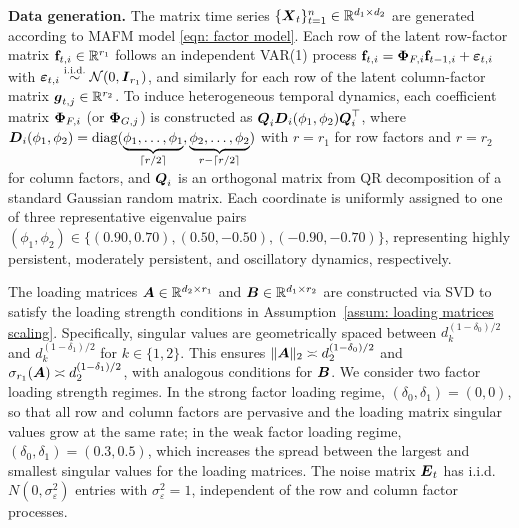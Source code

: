 \documentclass[11pt,letterpaper]{article}
\newcommand{\bfm}[1]{\ensuremath{\boldsymbol{#1}}} %
\def\bg{\bfm g}   \def\bG{\bfm G}  \def\GG{\mathbb{G}}
\theoremstyle{definition}
\newcommand{\bfv}{\mathbf{f}}
\begin{document}
\noindent
\textbf{Data generation.} The matrix time series $\{\bX_t\}_{t=1}^n \in \RR^{d_1 \times d_2}$ are generated according to MAFM model \eqref{eqn: factor model}. Each row of the latent row-factor matrix $\bfv_{t,i} \in \RR^{r_1}$ follows an independent VAR(1) process $\bfv_{t,i} = \bPhi_{F,i} \bfv_{t-1,i} + \boldsymbol{\varepsilon}_{t,i}$ with $\boldsymbol{\varepsilon}_{t,i} \stackrel{\text{i.i.d.}}{\sim} \cN(0, \bI_{r_1})$, and similarly for each row of the latent column-factor matrix $\bg_{t,j} \in \RR^{r_2}$. To induce heterogeneous temporal dynamics, each coefficient matrix $\boldsymbol{\Phi}_{F,i}$ (or $\boldsymbol{\Phi}_{G,j}$) is constructed as $\bQ_i \bD_i(\phi_1, \phi_2) \bQ_i^\top$, where $\bD_i(\phi_1, \phi_2) = {\rm diag}(\underbrace{\phi_1, \ldots, \phi_1}_{\lceil r/2\rceil}, \underbrace{\phi_2, \ldots, \phi_2}_{r-\lceil r/2\rceil})$ with $r = r_1$ for row factors and $r = r_2$ for column factors, and $\bQ_i$ is an orthogonal matrix from QR decomposition of a standard Gaussian random matrix. Each coordinate is uniformly assigned to one of three representative eigenvalue pairs $(\phi_1, \phi_2) \in \{(0.90, 0.70),(0.50, -0.50),(-0.90, -0.70)\}$, representing highly persistent, moderately persistent, and oscillatory dynamics, respectively. 

The loading matrices $\bA \in \RR^{d_2 \times r_1}$ and $\bB \in \RR^{d_1 \times r_2}$ are constructed via SVD to satisfy the loading strength conditions in Assumption~\ref{assum: loading matrices scaling}. Specifically, singular values are geometrically spaced between $d_k^{(1-\delta_0)/2}$ and $d_k^{(1-\delta_1)/2}$ for $k \in \{1,2\}$. This ensures $\|\bA\|_2 \asymp d_2^{(1-\delta_0)/2} $ and $\sigma_{r_1}(\bA) \asymp d_2^{(1-\delta_1)/2}$, with analogous conditions for $\bB$. We consider two factor loading strength regimes. In the strong factor loading regime, $(\delta_0,\delta_1)=(0,0)$, so that all row and column factors are pervasive and the loading matrix singular values grow at the same rate; in the weak factor loading regime, $(\delta_0,\delta_1)=(0.3,0.5)$, which increases the spread between the largest and smallest singular values for the loading matrices. 
The noise matrix $\bE_t$ has i.i.d. $N(0,\sigma^2_\varepsilon)$ entries with $\sigma^2_\varepsilon=1$, independent of the row and column factor processes.
\end{document}
